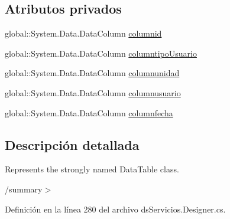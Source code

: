 \subsection*{Atributos privados}
\begin{DoxyCompactItemize}
\item 
global\-::\-System.\-Data.\-Data\-Column \hyperlink{class_proyecto___integrador__3_1_1ds_servicios_1_1_servicios_data_table_a42ed0070aba427354954b37e5955b03b}{columnid}
\item 
global\-::\-System.\-Data.\-Data\-Column \hyperlink{class_proyecto___integrador__3_1_1ds_servicios_1_1_servicios_data_table_ae6e9f606645938b441b38d9c7889971f}{columntipo\-Usuario}
\item 
global\-::\-System.\-Data.\-Data\-Column \hyperlink{class_proyecto___integrador__3_1_1ds_servicios_1_1_servicios_data_table_a3b6ef8814cd3226485969d0a1e3900d3}{columnunidad}
\item 
global\-::\-System.\-Data.\-Data\-Column \hyperlink{class_proyecto___integrador__3_1_1ds_servicios_1_1_servicios_data_table_a528b90d784325ac1cebec3c973dcd0e4}{columnusuario}
\item 
global\-::\-System.\-Data.\-Data\-Column \hyperlink{class_proyecto___integrador__3_1_1ds_servicios_1_1_servicios_data_table_a959f072e2c0689f46c30f9bc31b2cf16}{columnfecha}
\end{DoxyCompactItemize}


\subsection{Descripción detallada}
Represents the strongly named Data\-Table class. 

/summary$>$ 

Definición en la línea 280 del archivo ds\-Servicios.\-Designer.\-cs.



